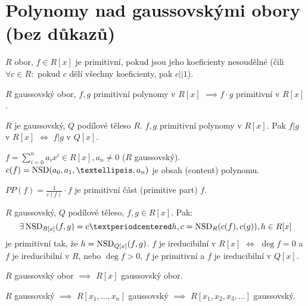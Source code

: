 \documentclass[12pt]{article}                   %
\begin{document}
\section{Polynomy nad gaussovskými obory (bez důkazů)}
    \begin{definice}
        $R$ obor, $f \in R[x]$ je primitivní, pokud jsou jeho koeficienty nesoudělné (čili $\forall c \in R:$ pokud $c$ dělí všechny koeficienty, pak $c||1$).
    \end{definice}

    \begin{veta}
        $R$ gaussovský obor, $f, g$ primitivní polynomy v $R[x]$ $\implies f·g$ primitivní v $R[x]$.
    \end{veta}

    \begin{tvrzeni}
        $R$ je gaussovský, $Q$ podílové těleso $R$. $f, g$ primitivní polynomy v $R[x]$. Pak $f|g$ v $R[x]$ $\Leftrightarrow$ $f|g$ v $Q[x]$.
    \end{tvrzeni}

    \begin{definice}[Značení]
        $f = \sum_{i=0}^n a_ix^i \in R[x], a_n ≠ 0$ ($R$ gaussovský). $c(f) = \NSD(a_0, a_1, …, a_n)$ je obsah (content) polynomu.

        $PP(f) = \frac{1}{c(f)}·f$ je primitivní část (primitive part) $f$.
    \end{definice}

    \begin{veta}
        $R$ gaussovský, $Q$ podílové těleso, $f, g \in R[x]$. Pak:
        $$ \exists \NSD_{R[x]} (f, g) = c·h, c = \NSD_R(c(f), c(g)), h \in R[x] $$
        je primitivní tak, že $h = \operatorname{NSD}_{Q[x]}(f, g)$.
        $f$ je ireducibilní v $R[x]$ $\Leftrightarrow$ $\deg f = 0$ a $f$ je ireducibilní v $R$, nebo $\deg f > 0$, $f$ je primitivní a $f$ je ireducibilní v $Q[x]$.
    \end{veta}

    \begin{veta}[Gaussova]
        $R$ gaussovský obor $\implies$ $R[x]$ gaussovský obor.
    \end{veta}

    \begin{dusledek}
        $R$ gaussovský $\implies$ $R[x_1, …, x_n]$ gaussovský $\implies$ $R[x_1, x_2, x_3, …]$ gaussovský.
    \end{dusledek}
\end{document}
